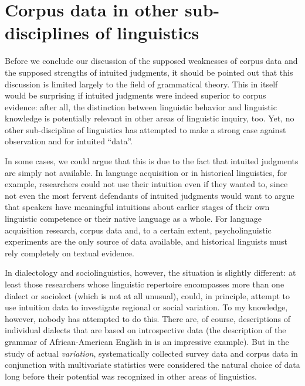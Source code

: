 \section{Corpus data in other sub-disciplines of linguistics}
\label{1_4}

Before we conclude our discussion of the supposed weaknesses of corpus data and the supposed strengths of intuited judgments, it should be pointed out that this discussion is limited largely to the field of grammatical theory. This in itself would be surprising if intuited judgments were indeed superior to corpus evidence: after all, the distinction between linguistic behavior and linguistic knowledge is potentially relevant in other areas of linguistic inquiry, too. Yet, no other sub-discipline of linguistics has attempted to make a strong case against observation and for intuited ``data''.

In some cases, we could argue that this is due to the fact that intuited judgments are simply not available. In language acquisition or in historical linguistics, for example, researchers could not use their intuition even if they wanted to, since not even the most fervent defendants of intuited judgments would want to argue that speakers have meaningful intuitions about earlier stages of their own linguistic competence or their native language as a whole. For language acquisition research, corpus data and, to a certain extent, psycholinguistic experiments are the only source of data available, and historical linguists must rely completely on textual evidence.

In dialectology and sociolinguistics, however, the situation is slightly different: at least those researchers whose linguistic repertoire encompasses more than one dialect or sociolect (which is not at all unusual), could, in principle, attempt to use intuition data to investigate regional or social variation. To my knowledge, however, nobody has attempted to do this. There are, of course, descriptions of individual dialects that are based on introspective data (the description of the grammar of African-American English in \citet{green_african_2002} is an impressive example). But in the study of actual \emph{variation}, systematically collected survey data \citep[e.g.][]{labov_atlas_2006} and corpus data in conjunction with multivariate statistics \citep[e.g.][]{tagliamonte_analysing_2006} were considered the natural choice of data long before their potential was recognized in other areas of linguistics. 

